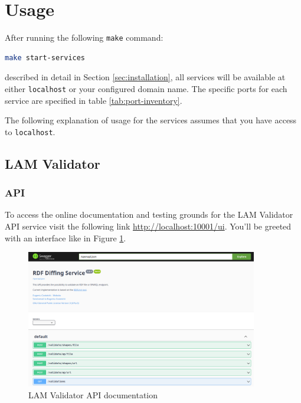 \section{Usage}
\label{sec:usage}

After running the following \texttt{make} command:

\begin{lstlisting}[language=bash,]
make start-services
\end{lstlisting}

described in detail in Section \ref{sec:installation}, all services will be available at either \texttt{localhost} or your configured domain name. The specific ports for each service are specified in table \ref{tab:port-inventory}. 

The following explanation of usage for the services assumes that you have access to \texttt{localhost}. 

\subsection{LAM Validator}
\subsubsection{API}
To access the online documentation and testing grounds for the LAM Validator API service visit the following link \url{http://localhost:10001/ui}. You'll be greeted with an interface like in Figure \ref{fig:validator-api-documentation}.

\begin{figure}[H]
  \centering
  \includegraphics[width=0.9\textwidth]{images/usage/validator-api.png}
  \caption{LAM Validator API documentation}
  \label{fig:validator-api-documentation}
\end{figure} 

